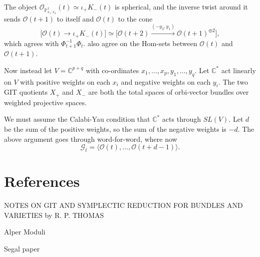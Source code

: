 \documentclass[12pt]{article}
\begin{document}
The object $\mathcal{O}_{\mathbb{P}^1_{x_1:x_2}}(t) \simeq \iota_+K_{-}(t)$ is spherical, and
the inverse twist around it sends $\mathcal{O}(t+1)$ to itself and $\mathcal{O}(t)$ to the cone
\[
  \big[\mathcal{O}(t) \longrightarrow \iota_+K_{-}(t)\big]
  \simeq \big[\mathcal{O}(t+2) \xrightarrow{(-y_2,y_1)} \mathcal{O}(t+1)^{\oplus 2}\big],
\]
which agrees with $\Phi_{t+1}^{-1}\Phi_t$. also agree on the Hom-sets between $\mathcal{O}(t)$ and
$\mathcal{O}(t+1)$.

Now instead let $V = \mathbb{C}^{p+q}$ with co-ordinates $x_1,\ldots,x_p, y_1,\ldots,y_q$.
Let $\mathbb{C}^*$ act linearly on $V$ with positive weights on each $x_i$ and negative weights
on each $y_i$. The two GIT quotients $X_+$ and $X_-$ are both the total spaces of orbi-vector
bundles over weighted projective spaces.

We must assume the Calabi-Yau condition that $\mathbb{C}^*$ acts through $SL(V)$. Let $d$ be the
sum of the positive weights, so the sum of the negative weights is $-d$. The above argument goes
through word-for-word, where now
\[
  \mathcal{G}_t = \langle \mathcal{O}(t), \ldots, \mathcal{O}(t+d-1)\rangle.
\]



\section{References}
NOTES ON GIT AND SYMPLECTIC REDUCTION FOR
BUNDLES AND VARIETIES
by R. P. THOMAS

Alper Moduli

Segal paper
\end{document}
